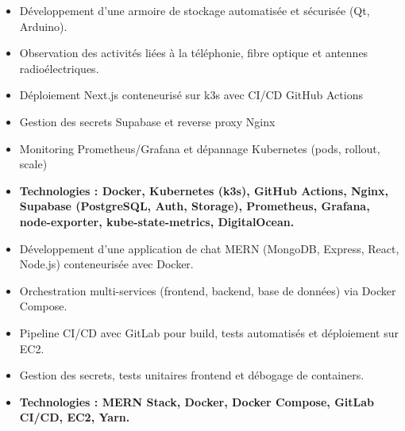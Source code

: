 \documentclass[10pt,a4paper]{altacv}
\begin{document}
\vspace{1em}

\begin{itemize}
  \item Développement d'une armoire de stockage automatisée et sécurisée (Qt, Arduino).
\end{itemize}

\vspace{1em}

\begin{itemize}
  \item Observation des activités liées à la téléphonie, fibre optique et antennes radioélectriques.
\end{itemize}


\begin{itemize}
  \item Déploiement Next.js conteneurisé sur k3s avec CI/CD GitHub Actions
  \item Gestion des secrets Supabase et reverse proxy Nginx
  \item Monitoring Prometheus/Grafana et dépannage Kubernetes (pods, rollout, scale)
  \item \textbf{Technologies : Docker, Kubernetes (k3s), GitHub Actions, Nginx, Supabase (PostgreSQL, Auth, Storage), Prometheus, Grafana, node-exporter, kube-state-metrics, DigitalOcean.}
\end{itemize}

\begin{itemize}
  \item Développement d'une application de chat MERN (MongoDB, Express, React, Node.js) conteneurisée avec Docker.
  \item Orchestration multi-services (frontend, backend, base de données) via Docker Compose.
  \item Pipeline CI/CD avec GitLab pour build, tests automatisés et déploiement sur EC2.
  \item Gestion des secrets, tests unitaires frontend et débogage de containers.
  \item \textbf{Technologies : MERN Stack, Docker, Docker Compose, GitLab CI/CD, EC2, Yarn.}
\end{itemize}
\end{document}
